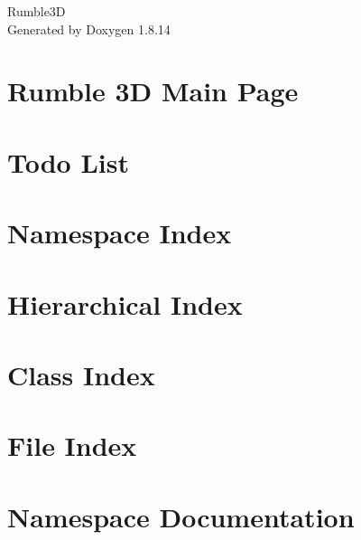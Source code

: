 \documentclass[twoside]{book}
\newcommand{\+}{\discretionary{\mbox{\scriptsize$\hookleftarrow$}}{}{}}
\newcommand{\clearemptydoublepage}{%
  \newpage{\pagestyle{empty}\cleardoublepage}%
}
\begin{document}
\hypersetup{pageanchor=false,
             bookmarksnumbered=true,
             pdfencoding=unicode
            }
\begin{titlepage}
\vspace*{7cm}
\begin{center}%
{\Large Rumble3D }\\
\vspace*{1cm}
{\large Generated by Doxygen 1.8.14}\\
\end{center}
\end{titlepage}
\clearemptydoublepage
{}
\tableofcontents
\clearemptydoublepage
{}
\hypersetup{pageanchor=true}

\chapter{Rumble 3D Main Page}
\label{index}\hypertarget{index}{}
\chapter{Todo List}
\label{todo}

\chapter{Namespace Index}

\chapter{Hierarchical Index}

\chapter{Class Index}

\chapter{File Index}

\chapter{Namespace Documentation}


\end{document}
